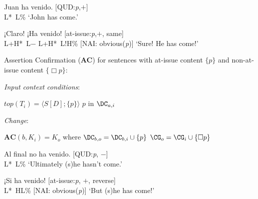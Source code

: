 \begin{exe} 
\ex \label{ex:havenidoOBVconf}
	\begin{xlist}
		\ex
		\begin{xlist}[A:]  
		 Juan ha venido. \hfill [QUD:\textit{p},$+$] \\
		\hspace*{5em} L*~L\%
		\glt `John has come.'
		\end{xlist}
		\ex 
		\begin{xlist}[A:]
		 ¡Claro! ¡Ha venido! \hfill [at-issue:\textit{p},$+$, same] \\
		\hspace*{.1em} L+H*~L$-$ \hspace*{.3em} L+H*~L!H\% \hfill [\ac{NAI}: obvious(\textit{p})] 
		\glt `Sure! He has come!'
		\end{xlist}
	\end{xlist}

\ex\label{ex:assertionconfirmationOBV} Assertion Confirmation (\textbf{AC}) for sentences with at-issue content $\{ p \}$ and non-at-issue content $\{ \Box p \}$:
	\begin{xlist}
		\ex \textit{Input context conditions}: 
		\begin{xlist}
			\ex $\textit{top}(T_i)=\langle S [D];\{ p \}\rangle$
			\ex $p$ in $\DC_{a,i}$ 
		\end{xlist}
		
		\ex \textit{Change}: 
		\begin{xlist}
			\ex $\textbf{AC}(b,K_i)=K_o$ where $\DC_{b,o}=\DC_{b,i}\cup \{ p \}$
			\ex $\CG_{o} = \CG_{i} \cup \{ \Box p \}$
		\end{xlist}
	\end{xlist}

\ex \label{ex:havenidoOBVdenial} 
	\begin{xlist}
		\ex 
		\begin{xlist}[A:]
		 Al final no ha venido. \hfill [QUD:\textit{p}, $-$] \\
		\hspace*{6.5em} L*~L\% 
		\glt `Ultimately (s)he hasn't come.'
		\end{xlist}
		
		\ex 
		\begin{xlist}[A:]
		 ¡Si ha venido! \hfill [at-issue:\textit{p}, $+$, reverse] \\
		\hspace*{3.5em} L*~HL\% \hfill [\ac{NAI}: obvious(\textit{p})]
		\glt `But (s)he has come!'
		\end{xlist}
	\end{xlist}


\end{exe}
